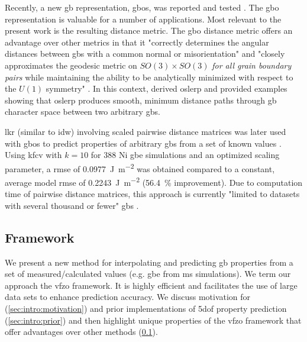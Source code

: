 \documentclass[final,twocolumn,12pt]{elsarticle}
\begin{document}
Recently, a new \gls{gb} representation, \glspl{gbo}, was reported \cite{francisGeodesicOctonionMetric2019} and tested \cite{chesserLearningGrainBoundary2020}. The \gls{gbo} representation is valuable for a number of applications. Most relevant to the present work is the resulting distance metric. The \gls{gbo} distance metric offers an advantage over other metrics in that it "correctly determines the angular distances between \glspl{gb} with a common normal or misorientation" and "closely approximates the geodesic metric on $SO(3) \times SO(3)$ \textit{for all grain boundary pairs} while maintaining the ability to be analytically minimized with respect to the $U(1)$ symmetry" \cite{francisGeodesicOctonionMetric2019}. In this context, \citet{francisGeodesicOctonionMetric2019} derived \gls{oslerp} and provided examples showing that \gls{oslerp} produces smooth, minimum distance paths through \gls{gb} character space between two arbitrary \glspl{gb}. 

\Gls{lkr} (similar to \gls{idw}) involving scaled pairwise distance matrices was later used with \glspl{gbo} to predict properties of arbitrary \glspl{gb} from a set of known values \cite{chesserLearningGrainBoundary2020}. Using \gls{kfcv} with $k=10$ for \num{388} Ni \gls{gbe} simulations \cite{olmstedSurveyComputedGrain2009a} and an optimized scaling parameter, a \gls{rmse} of \SI{0.0977}{\J\per\square\meter} was obtained compared to a constant, average model \gls{rmse} of \SI{0.2243}{\J\per\square\m} (\SI{56.4}{\percent} improvement). Due to computation time of pairwise distance matrices, this approach is currently "limited to datasets with several thousand or fewer" \glspl{gb} \cite{chesserLearningGrainBoundary2020}.

\subsection{ Framework}
\label{sec:intro:vfzo}
We present a new method for interpolating and predicting \gls{gb} properties from a set of measured/calculated values (e.g. \gls{gbe} from \gls{ms} simulations). We term our approach the \gls{vfzo} framework. It is highly efficient and facilitates the use of large data sets to enhance prediction accuracy. We discuss motivation for (\cref{sec:intro:motivation}) and prior implementations of \gls{5dof} property prediction (\cref{sec:intro:prior}) and then highlight unique properties of the \gls{vfzo} framework that offer advantages over other methods (\cref{sec:intro:vfzo}).
\end{document}

